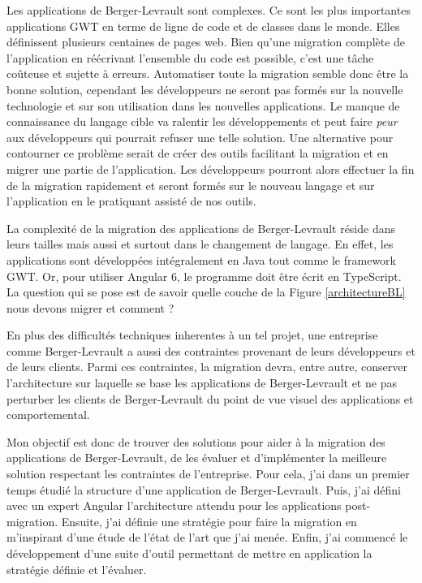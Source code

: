 \documentclass[11pt,]{article}
\begin{document}
Les applications de Berger-Levrault sont complexes. Ce sont les plus
importantes applications GWT en terme de ligne de code et de classes
dans le monde. Elles définissent plusieurs centaines de pages web. Bien
qu'une migration complète de l'application en réécrivant l'ensemble du
code est possible, c'est une tâche coûteuse et sujette à erreurs.
Automatiser toute la migration semble donc être la bonne solution,
cependant les développeurs ne seront pas formés sur la nouvelle
technologie et sur son utilisation dans les nouvelles applications. Le
manque de connaissance du langage cible va ralentir les développements
et peut faire \emph{peur} aux développeurs qui pourrait refuser une
telle solution. Une alternative pour contourner ce problème serait de
créer des outils facilitant la migration et en migrer une partie de
l'application. Les développeurs pourront alors effectuer la fin de la
migration rapidement et seront formés sur le nouveau langage et sur
l'application en le pratiquant assisté de nos outils.

La complexité de la migration des applications de Berger-Levrault réside
dans leurs tailles mais aussi et surtout dans le changement de langage.
En effet, les applications sont développées intégralement en Java tout
comme le framework GWT. Or, pour utiliser Angular 6, le programme doit
être écrit en TypeScript. La question qui se pose est de savoir quelle
couche de la Figure \ref{architectureBL} nous devons migrer et comment ?

En plus des difficultés techniques inherentes à un tel projet, une
entreprise comme Berger-Levrault a aussi des contraintes provenant de
leurs développeurs et de leurs clients. Parmi ces contraintes, la
migration devra, entre autre, conserver l'architecture sur laquelle se
base les applications de Berger-Levrault et ne pas perturber les clients
de Berger-Levrault du point de vue visuel des applications et
comportemental.

Mon objectif est donc de trouver des solutions pour aider à la migration
des applications de Berger-Levrault, de les évaluer et d'implémenter la
meilleure solution respectant les contraintes de l'entreprise. Pour
cela, j'ai dans un premier temps étudié la structure d'une application
de Berger-Levrault. Puis, j'ai défini avec un expert Angular
l'architecture attendu pour les applications post-migration. Ensuite,
j'ai définie une stratégie pour faire la migration en m'inspirant d'une
étude de l'état de l'art que j'ai menée. Enfin, j'ai commencé le
développement d'une suite d'outil permettant de mettre en application la
stratégie définie et l'évaluer.
\end{document}
